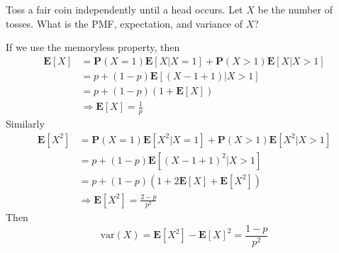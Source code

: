 \begin{example}
    Toss a fair coin independently until a head occurs. Let $X$ be the number of tosses. What is the PMF, expectation, and variance of $X$? 
    \begin{solution}
        If we use the memoryless property, then 
        \begin{equation}
        \begin{aligned}
            \mathbf{E}[X] &= \mathbf{P}(X = 1)\mathbf{E}[X | X = 1] + \mathbf{P}(X > 1)\mathbf{E}[X | X > 1] \\ 
            &= p + (1-p)\mathbf{E}[(X - 1 + 1) | X > 1] \\
            &= p + (1-p)(1 + \mathbf{E}[X]) \\ 
            &\Rightarrow \mathbf{E}[X] = \frac{1}{p}
        \end{aligned}
        \end{equation}
        Similarly
        \begin{equation}
        \begin{aligned}
            \mathbf{E}[X^2] &= \mathbf{P}(X = 1)\mathbf{E}[X^2 | X = 1] + \mathbf{P}(X > 1)\mathbf{E}[X^2 | X > 1] \\
            &= p + (1-p)\mathbf{E}[(X - 1 + 1)^2 | X > 1] \\
            &= p + (1-p)(1 + 2\mathbf{E}[X] + \mathbf{E}[X^2]) \\
            &\Rightarrow \mathbf{E}[X^2] = \frac{2-p}{p^2}
        \end{aligned}
        \end{equation}
        Then
        \begin{equation}
            \text{var}(X) = \mathbf{E}[X^2] - \mathbf{E}[X]^2 = \frac{1-p}{p^2}
        \end{equation}
    \end{solution}
\end{example}

